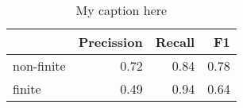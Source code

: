 \begin{table}[!ht]
\centering
\begin{tabular}{lrrr}
\toprule
{} &  Precission &  Recall &   F1 \\
\midrule
non-finite &        0.72 &    0.84 & 0.78 \\
finite     &        0.49 &    0.94 & 0.64 \\
\bottomrule
\end{tabular}
\caption{My caption here}
\label{tab:FINITENESS-ocd-combined-F1}
\end{table}